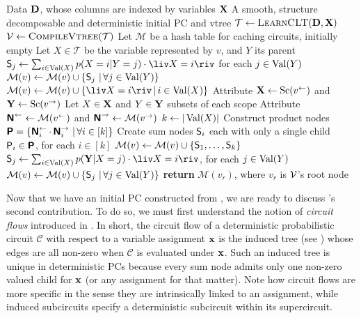 \begin{algorithm}[t]
  \caption{}\label{alg:strudelinit}
  \begin{algorithmic}[1]
    \Require Data $\mathbf{D}$, whose columns are indexed by variables $\mathbf{X}$
    \Ensure A smooth, structure decomposable and deterministic initial PC and vtree
    \State $\mathcal{T}\gets\textproc{LearnCLT}(\set{D},\set{X})$
    \State $\vtree\gets\textproc{CompileVtree}(\mathcal{T})$
    \State Let $\mathcal{M}$ be a hash table for caching circuits, initially empty
        \State Let $X\in\mathcal{T}$ be the variable represented by $v$, and $Y$ its parent
          \State $\Sum_j\gets\sum_{i\in\Val(X)}p(X=i|Y=j)\cdot\liv X=i\riv$ for each $j\in\operatorname*{\normalfont{Val}}(Y)$
          \State $\mathcal{M}(v)\gets\mathcal{M}(v)\cup\{\operatorname{\textup{\textsf{S}}}_j\,|\,\forall j\in\operatorname*{\normalfont{Val}}(Y)\}$
        \Else
          \State $\mathcal{M}(v)\gets\mathcal{M}(v)\cup\{\liv X=i\riv\,|\,i\in\Val(X)\}$
        \EndIf
      \Else
        \State Attribute $\mathbf{X}\gets\operatorname*{\normalfont{Sc}}(v^\gets)$ and $\mathbf{Y}\gets\operatorname*{\normalfont{Sc}}(v^\to)$
        \State Let $X\in\mathbf{X}$ and $Y\in\mathbf{Y}$ subsets of each scope
        \State Attribute $\operatorname{\textup{\textsf{\textbf{N}}}}^\gets\gets\mathcal{M}(v^\gets)$ and $\operatorname{\textup{\textsf{\textbf{N}}}}^\to\gets\mathcal{M}(v^\to)$
        \State $k\gets|\operatorname*{\normalfont{Val}}(X)|$
        \State Construct product nodes $\operatorname{\textup{\textsf{\textbf{P}}}}=\{\operatorname{\textup{\textsf{\textbf{N}}}}_i^\gets\cdot\operatorname{\textup{\textsf{\textbf{N}}}}_i^\to\,|\,\forall i\in\left[k\right]\}$
          \State Create sum nodes $\operatorname{\textup{\textsf{S}}}_i$ each with only a single child $\operatorname{\textup{\textsf{P}}}_i\in\operatorname{\textup{\textsf{\textbf{P}}}}$, for each $i\in\left[k\right]$
          \State $\mathcal{M}(v)\gets\mathcal{M}(v)\cup\{\operatorname{\textup{\textsf{S}}}_1,\ldots,\operatorname{\textup{\textsf{S}}}_k\}$
        \Else
          \State $\Sum_j\gets\sum_{i\in\Val(X)}p(\set{Y}|X=j)\cdot\liv X=i\riv$, for each $j\in\operatorname*{\normalfont{Val}}(Y)$
          \State $\mathcal{M}(v)\gets\mathcal{M}(v)\cup\{\operatorname{\textup{\textsf{S}}}_j\,|\,\forall j\in\operatorname*{\normalfont{Val}}(Y)\}$
        \EndIf
      \EndIf
    \EndFor
    \State \textbf{return} $\mathcal{M}(v_r)$, where $v_r$ is $\operatorname{\mathcal{V}}$'s root node
  \end{algorithmic}
\end{algorithm}

Now that we have an initial PC constructed from , we are ready to discuss
's second contribution. To do so, we must first understand the notion of
\emph{circuit flows} introduced in \citet{dang20}. In short, the circuit flow of a deterministic
probabilistic circuit $\mathcal{C}$ with respect to a variable assignment $\mathbf{x}$ is the induced
tree (see ) whose edges are all non-zero when $\mathcal{C}$ is evaluated under
$\mathbf{x}$. Such an induced tree is unique in deterministic PCs because every sum node admits only
one non-zero valued child for $\mathbf{x}$ (or any assignment for that matter). Note how circuit flows
are more specific in the sense they are intrinsically linked to an assignment, while induced
subcircuits specify a deterministic subcircuit within its supercircuit.


